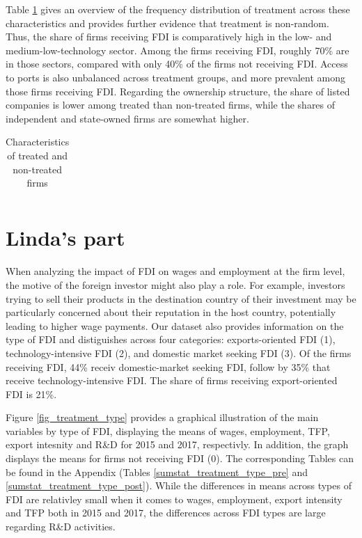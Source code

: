 Table \ref{treatment_char} gives an overview of the frequency distribution of treatment across these characteristics and provides further evidence that treatment is non-random. Thus, the share of firms receiving FDI is comparatively high in the low- and medium-low-technology sector. Among the firms receiving FDI, roughly 70\% are in those sectors, compared with only 40\% of the firms not receiving FDI. Access to ports is also unbalanced across treatment groups, and more prevalent among those firms receiving FDI. Regarding the ownership structure, the share of listed companies is lower among treated than non-treated firms, while the shares of independent and state-owned firms are somewhat higher.  \\ \par


\begin{centering}
\begin{table}[htbp]\centering \caption{Characteristics of treated and non-treated firms\label{treatment_char}}
\begin{tabular}[htbp!]{lrrrrrrrrrr}
\hline\hline

\hline\hline
\end{tabular} 
 \end{table}
 \end{centering}
 
 
 \section{Linda's part}
 
When analyzing the impact of FDI on wages and employment at the firm level, the  motive of the foreign investor might also play a role. For example, investors trying to sell their products in the destination country of their investment  may be particularly concerned about their reputation in the host country, potentially leading to higher wage payments. Our dataset also provides information on the type of FDI and distiguishes across four categories: exports-oriented FDI (1),  technology-intensive FDI (2), and domestic market seeking FDI (3). Of the firms receiving FDI, 44\% receiv domestic-market seeking FDI, follow by 35\% that receive technology-intensive FDI. The share of firms receiving export-oriented FDI is 21\%. \\ \par

Figure \ref{fig_treatment_type} provides a graphical illustration of the main variables by type of FDI, displaying the means of wages, employment, TFP, export intesnity and R\&D for 2015 and 2017, respectivly. In addition, the graph displays the means for firms not receiving FDI (0). The corresponding Tables can be found in the Appendix (Tables \ref{sumstat_treatment_type_pre} and \ref{sumstat_treatment_type_post}). While the differences in means across types of FDI are relativley small when it comes to wages, employment, export intensity and TFP both in 2015 and 2017, the differences across FDI types are large regarding R\&D activities.



